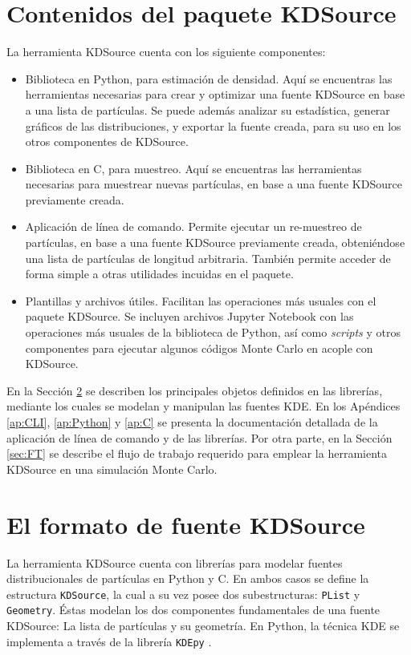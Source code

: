 \section{Contenidos del paquete KDSource}

La herramienta KDSource cuenta con los siguiente componentes:
\begin{itemize}
	\item Biblioteca en Python, para estimación de densidad. Aquí se encuentras las herramientas necesarias para crear y optimizar una fuente KDSource en base a una lista de partículas. Se puede además analizar su estadística, generar gráficos de las distribuciones, y exportar la fuente creada, para su uso en los otros componentes de KDSource.
	\item Biblioteca en C, para muestreo. Aquí se encuentras las herramientas necesarias para muestrear nuevas partículas, en base a una fuente KDSource previamente creada.
	\item Aplicación de línea de comando. Permite ejecutar un re-muestreo de partículas, en base a una fuente KDSource previamente creada, obteniéndose una lista de partículas de longitud arbitraria. También permite acceder de forma simple a otras utilidades incuidas en el paquete.
	\item Plantillas y archivos útiles. Facilitan las operaciones más usuales con el paquete KDSource. Se incluyen archivos Jupyter Notebook con las operaciones más usuales de la biblioteca de Python, así como \emph{scripts} y otros componentes para ejecutar algunos códigos Monte Carlo en acople con KDSource.
\end{itemize}

En la Sección \ref{sec:libs} se describen los principales objetos definidos en las librerías, mediante los cuales se modelan y manipulan las fuentes KDE. En los Apéndices  \ref{ap:CLI}, \ref{ap:Python} y \ref{ap:C} se presenta la documentación detallada de la aplicación de línea de comando y de las librerías. Por otra parte, en la Sección \ref{sec:FT} se describe el flujo de trabajo requerido para emplear la herramienta KDSource en una simulación Monte Carlo.


\section{El formato de fuente KDSource}
\label{sec:libs}

La herramienta KDSource cuenta con librerías para modelar fuentes distribucionales de partículas en Python y C. En ambos casos se define la estructura \verb|KDSource|, la cual a su vez posee dos subestructuras: \verb|PList| y \verb|Geometry|. Éstas modelan los dos componentes fundamentales de una fuente KDSource: La lista de partículas y su geometría. En Python, la técnica KDE se implementa a través de la librería \verb|KDEpy| \cite{KDEpy}.

